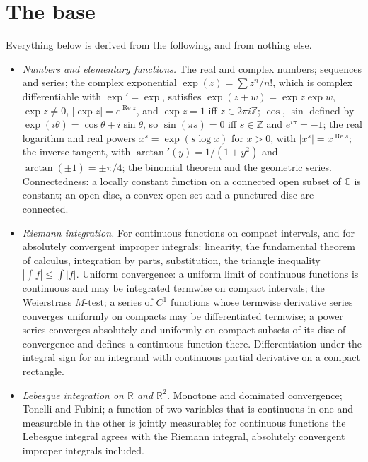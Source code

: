 \documentclass[11pt]{article}
\theoremstyle{definition}
\newcommand{\C}{\mathbb{C}}
\newcommand{\R}{\mathbb{R}}
\newcommand{\Z}{\mathbb{Z}}
\newcommand{\re}{\operatorname{Re}}
\begin{document}
\section{The base}\label{sec:base}

Everything below is derived from the following, and from nothing else.

\begin{itemize}
\item[(B0)] \emph{Numbers and elementary functions.} The real and complex numbers; sequences and series; the complex exponential $\exp(z)=\sum z^{n}/n!$, which is complex differentiable with $\exp'=\exp$, satisfies $\exp(z+w)=\exp z\exp w$, $\exp z\ne0$, $|\exp z|=e^{\re z}$, and $\exp z=1$ iff $z\in2\pi i\Z$; $\cos$, $\sin$ defined by $\exp(i\theta)=\cos\theta+i\sin\theta$, so $\sin(\pi s)=0$ iff $s\in\Z$ and $e^{i\pi}=-1$; the real logarithm and real powers $x^{s}=\exp(s\log x)$ for $x>0$, with $|x^{s}|=x^{\re s}$; the inverse tangent, with $\arctan'(y)=1/(1+y^{2})$ and $\arctan(\pm1)=\pm\pi/4$; the binomial theorem and the geometric series. Connectedness: a locally constant function on a connected open subset of $\C$ is constant; an open disc, a convex open set and a punctured disc are connected.
\item[(B1)] \emph{Riemann integration.} For continuous functions on compact intervals, and for absolutely convergent improper integrals: linearity, the fundamental theorem of calculus, integration by parts, substitution, the triangle inequality $|\int f|\le\int|f|$. Uniform convergence: a uniform limit of continuous functions is continuous and may be integrated termwise on compact intervals; the Weierstrass $M$-test; a series of $C^{1}$ functions whose termwise derivative series converges uniformly on compacts may be differentiated termwise; a power series converges absolutely and uniformly on compact subsets of its disc of convergence and defines a continuous function there. Differentiation under the integral sign for an integrand with continuous partial derivative on a compact rectangle.
\item[(B2)] \emph{Lebesgue integration on $\R$ and $\R^{2}$.} Monotone and dominated convergence; Tonelli and Fubini; a function of two variables that is continuous in one and measurable in the other is jointly measurable; for continuous functions the Lebesgue integral agrees with the Riemann integral, absolutely convergent improper integrals included.
\end{itemize}
\end{document}
